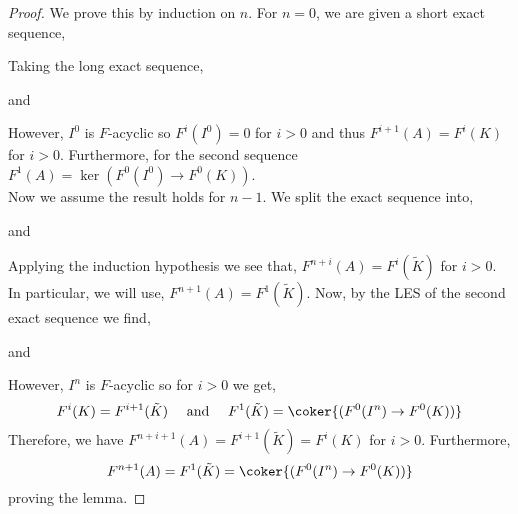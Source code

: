 \documentclass[12pt]{article}
\begin{document}
\begin{proof}
We prove this by induction on $n$. For $n = 0$, we are given a short exact sequence,
\begin{center}
\end{center}
Taking the long exact sequence,
\begin{center}
\end{center}
and
\begin{center}
\end{center}
However, $I^0$ is $F$-acyclic so $F^i(I^0) = 0$ for $i > 0$ and thus $F^{i + 1}(A) = F^i(K)$ for $i > 0$. Furthermore, for the second sequence $F^1(A) = \ker{(F^0(I^0) \to F^0(K))}$. 
\bigskip\\
Now we assume the result holds for $n-1$. We split the exact sequence into,
\begin{center}
\end{center}
and 
\begin{center}
\end{center}
Applying the induction hypothesis we see that,
$F^{n + i}(A) = F^{i}(\tilde{K})$
for $i > 0$. In particular, we will use, $F^{n+1}(A) = F^{1}(\tilde{K})$. Now, by the LES of the second exact sequence we find,
\begin{center}
\end{center}
and
\begin{center}
\end{center}
However, $I^n$ is $F$-acyclic so for $i > 0$ we get,
\[ F^i(K) = F^{i+1}(\tilde{K}) \quad \text{ and } \quad F^1(\tilde{K}) = \coker{(F^0(I^n) \to F^0(K))} \] 
Therefore, we have $F^{n + i + 1}(A) = F^{i+1}(\tilde{K}) = F^i(K)$ for $i > 0$. Furthermore, \[ F^{n+1}(A) = F^1(\tilde{K}) = \coker{(F^0(I^n) \to F^0(K))} \]
proving the lemma.
\end{proof}
\end{document}

